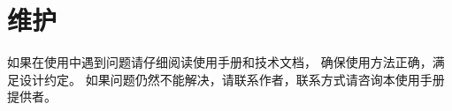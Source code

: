 \section{维护}
    如果在使用中遇到问题请仔细阅读使用手册和技术文档，%
    确保使用方法正确，满足设计约定。%
    如果问题仍然不能解决，请联系作者，联系方式请咨询本使用手册提供者。
